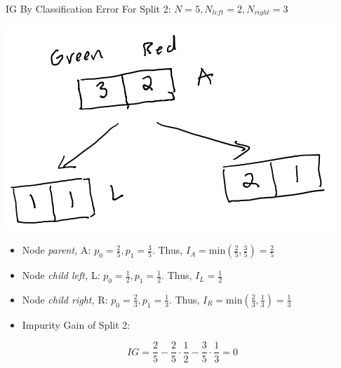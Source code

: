 \documentclass[
  ignorenonframetext,
]{beamer}
\begin{document}
\begin{frame}{IG By Classification Error}
\label{ig-by-classification-error-1}
For Split 2: \(N = 5, N_{left} =2, N_{right} = 3\)

\includegraphics{images/im3.png}

\begin{itemize}
\item
  Node \emph{parent,} A: \(p_0 = \frac{2}{5}, p_1 = \frac{3}{5}\). Thus,
  \(I_{A} = \text{min}(\frac{2}{5}, \frac{3}{5}) = \frac{2}{5}\)
\item
  Node \emph{child left,} L: \(p_0 = \frac{1}{2}, p_1 = \frac{1}{2}\).
  Thus, \(I_{L} = \frac{1}{2}\)
\item
  Node \emph{child right,} R: \(p_0 = \frac{2}{3}, p_1 = \frac{1}{3}\).
  Thus, \(I_{R} = \text{min}(\frac{2}{3}, \frac{1}{3}) = \frac{1}{3}\)
\item
  Impurity Gain of Split 2:
\end{itemize}

\[IG = \frac{2}{5} - \frac{2}{5} \cdot \frac{1}{2}-\frac{3}{5} \cdot \frac{1}{3} = 0\]
\end{frame}
\end{document}
